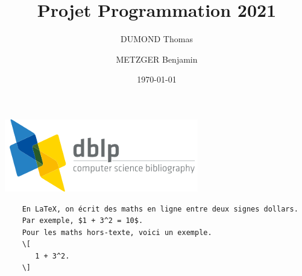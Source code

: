 \documentclass{article}
\date{\today}
\author{DUMOND Thomas\and METZGER Benjamin}
\title{Projet Programmation 2021}
\begin{document}
\maketitle
\begin{center}
    \includegraphics[scale=0.3]{dblp}
\end{center}
\begin{verbatim}
    En LaTeX, on écrit des maths en ligne entre deux signes dollars. 
    Par exemple, $1 + 3^2 = 10$.
    Pour les maths hors-texte, voici un exemple.
    \[
       1 + 3^2.
    \]
    \end{verbatim}
\end{document}
